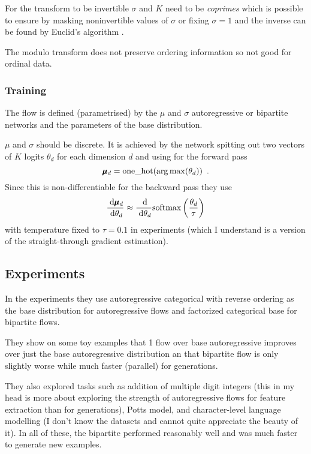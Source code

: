For the transform to be invertible $\sigma$ and $K$ need to be \emph{coprimes} which is possible to ensure by masking noninvertible values of $\sigma$ or fixing $\sigma = 1$ and the inverse can be found by Euclid's algorithm .

The modulo transform does not preserve ordering information so not good for ordinal data.

\subsubsection{Training}

The flow is defined (parametrised) by the $\mu$ and $\sigma$ autoregressive or bipartite networks and the parameters of the base distribution.

$\mu$ and $\sigma$ should be discrete. It is achieved by the network spitting out two vectors of $K$ logits $\theta_d$ for each dimension $d$ and using for the forward pass
\begin{equation}
\pmb{\mu}_d = \text{one\_hot}(\operatorname*{arg\,max}(\theta_d)) \enspace .
\end{equation}
Since this is non-differentiable for the backward pass they use
\begin{equation}
\frac{\; \text{d} \pmb{\mu}_d}{\; \text{d} \theta_d} \approx \frac{\; \text{d}}{\; \text{d} \theta_d}\text{softmax}\left(\frac{\theta_d}{\tau}\right)
\end{equation}
with temperature fixed to $\tau = 0.1$ in experiments (which I understand is a version of the straight-through gradient estimation).

\subsection{Experiments}

In the experiments they use autoregressive categorical with reverse ordering as the base distribution for autoregressive flows and factorized categorical base for bipartite flows.

They show on some toy examples that 1 flow over base autoregressive improves over just the base autoregressive distribution an that bipartite flow is only slightly worse while much faster (parallel) for generations.

They also explored tasks such as addition of multiple digit integers (this in my head is more about exploring the strength of autoregressive flows for feature extraction than for generations), Potts model, and character-level language modelling (I don't know the datasets and cannot quite appreciate the beauty of it).
In all of these, the bipartite performed reasonably well and was much faster to generate new examples.


